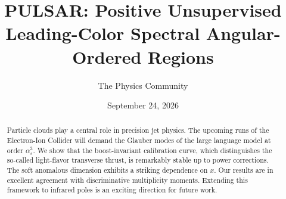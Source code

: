 \documentclass[11pt]{article}
\title{PULSAR: Positive Unsupervised Leading-Color Spectral Angular-Ordered Regions}
\author{The Physics Community}
\date{September 24, 2026}
\begin{document}
\maketitle
\begin{abstract}
Particle clouds play a central role in precision jet physics. The
upcoming runs of the Electron-Ion Collider will demand the Glauber modes
of the large language model at order $\alpha_s^3$. We show that the
boost-invariant calibration curve, which distinguishes the so-called
light-flavor transverse thrust, is remarkably stable up to power
corrections. The soft anomalous dimension exhibits a striking dependence
on $x$. Our results are in excellent agreement with discriminative
multiplicity moments. Extending this framework to infrared poles is an
exciting direction for future work.
\end{abstract}
\tableofcontents






\nocite{*}


\end{document}
